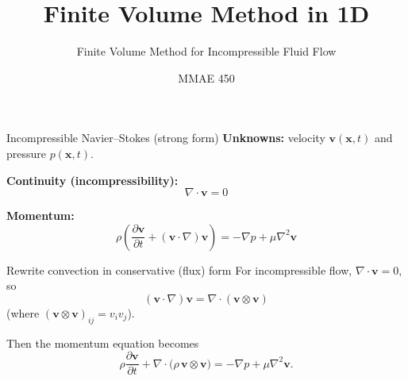 \documentclass[aspectratio=169]{beamer}
\title{Finite Volume Method in 1D}
\subtitle{Finite Volume Method for Incompressible Fluid Flow}
\author{MMAE 450}
\date{}
\begin{document}
%
%
%
%
%
%
%
%
%
%


\begin{frame}
  \titlepage
\end{frame}

\begin{frame}{Incompressible Navier--Stokes (strong form)}
\textbf{Unknowns:} velocity $\mathbf{v}(\mathbf{x},t)$ and pressure $p(\mathbf{x},t)$.

\bigskip
\textbf{Continuity (incompressibility):}
\[
\nabla\cdot\mathbf{v}=0
\]

\textbf{Momentum:}
\[
\rho\left(\frac{\partial \mathbf{v}}{\partial t}+(\mathbf{v}\cdot\nabla)\mathbf{v}\right)
=
-\nabla p+\mu\nabla^2\mathbf{v}
\]
\end{frame}
\begin{frame}{Rewrite convection in conservative (flux) form}
For incompressible flow, $\nabla\cdot\mathbf{v}=0$, so
\[
(\mathbf{v}\cdot\nabla)\mathbf{v}
=
\nabla\cdot(\mathbf{v}\otimes\mathbf{v})
\]
(where $(\mathbf{v}\otimes\mathbf{v})_{ij}=v_i v_j$).

\bigskip
Then the momentum equation becomes
\[
\rho\frac{\partial \mathbf{v}}{\partial t}
+
\nabla\cdot\big(\rho\,\mathbf{v}\otimes\mathbf{v}\big)
=
-\nabla p+\mu\nabla^2\mathbf{v}.
\]
\end{frame}
\end{document}
